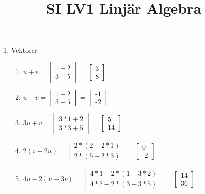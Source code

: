 \documentclass[a4paper]{article}
\title{SI LV1 Linjär Algebra}
\begin{document}
\maketitle

\begin{enumerate}
\item Vektorer
\begin{enumerate}
\item $u+v = \begin{bmatrix} 1+2 \\ 3+5 \end{bmatrix}$ = $\begin{bmatrix} 3\\ 8 \end{bmatrix}$
\item $u-v = \begin{bmatrix}1-2 \\ 3-5 \end{bmatrix}$ = $\begin{bmatrix}\text{-}1 \\ \text{-}2 \end{bmatrix}$
\item $3u+v = \begin{bmatrix} 3*1 + 2 \\ 3*3 + 5\end{bmatrix}$ = $\begin{bmatrix} 5 \\ 14\end{bmatrix}$
\item $2(v-2u) =\begin{bmatrix} 2*(2-2*1) \\ 2*(5-2*3)\end{bmatrix}$ =$\begin{bmatrix} 0 \\ \text{-}2\end{bmatrix}$
\item $4u-2(u-3v) = \begin{bmatrix}4*1-2*(1-3*2) \\ 4*3-2*(3-3*5)\end{bmatrix} = \begin{bmatrix}14\\ 36\end{bmatrix}$
\end{enumerate}


\end{enumerate}
\end{document}
